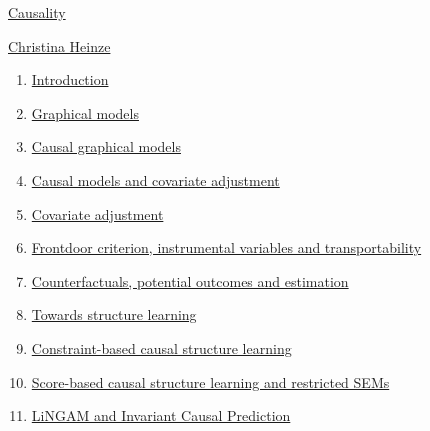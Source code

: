 \documentclass[11pt]{article}
\begin{document}
	\kaishu 
	\setcounter{section}{0}
	\begin{center}
		{\LARGE  \href{https://stat.ethz.ch/lectures/ss21/causality.php}{Causality}}
		
		
		{\large \href{https://christinaheinze.github.io/}{Christina Heinze}}
	\end{center}
\setcounter{page}{1}



\vspace{-1cm}

\begin{enumerate}
	\item \href{https://mp.weixin.qq.com/s/BCAkzOx5AKgpBVByO1Vp5Q}{Introduction}	%
	\item \href{https://mp.weixin.qq.com/s/RAsgQyFDkVZ53qrk9DaIsw}{Graphical models}	%
	\item \href{https://mp.weixin.qq.com/s/S-vzFYGQB_U9B8bL618OYA}{Causal graphical models}	%
	\item \href{https://mp.weixin.qq.com/s/1unXNgWZZxSqKy17KdIibA}{Causal models and covariate adjustment}	%
	\item \href{https://mp.weixin.qq.com/s/ZQqRiXs4DvKazoli1UOYWg}{Covariate adjustment}	%
	\item \href{https://mp.weixin.qq.com/s/tnSzVeko11E7aP1cCW2xCg}{Frontdoor criterion, instrumental variables and transportability}	%
	\item \href{https://mp.weixin.qq.com/s/Z4drzGFfblVFRTsBw9wBXA}{Counterfactuals, potential outcomes and estimation}	%
	\item \href{https://mp.weixin.qq.com/s/8j9XwhUKVy1rCka_WVXOhg}{Towards structure learning}	%
	\item \href{https://mp.weixin.qq.com/s/uYBHcXnYzg-bc2Zn7fVcLA}{Constraint-based causal structure learning}	%
	\item \href{https://mp.weixin.qq.com/s/eaSDnSGKHxNVoWlhXVngfw}{Score-based causal structure learning and restricted SEMs}	%
	\item \href{https://mp.weixin.qq.com/s/DZUgyzsQA3vwR15I0ZTQkQ}{LiNGAM and Invariant Causal Prediction}	%
\end{enumerate}
\end{document}
